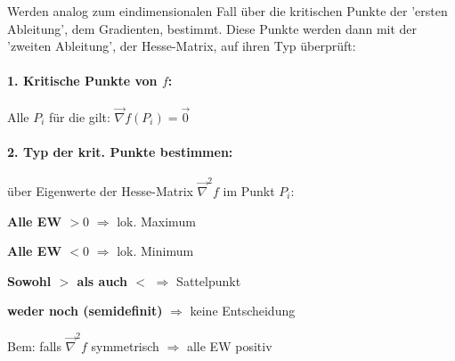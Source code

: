 \documentclass[a4paper]{article}
\begin{document}
		\begin{fsatz}
			Werden analog zum eindimensionalen Fall über die kritischen Punkte der 'ersten Ableitung', dem Gradienten, bestimmt. Diese Punkte werden dann mit der 'zweiten Ableitung', der Hesse-Matrix, auf ihren Typ überprüft:
				\vspace{-3mm}

			\paragraph{1. Kritische Punkte von $f$:} Alle $P_i$ für die gilt: $\vec{\nabla} f (P_i) = \vec{0}$
				\vspace{-3mm}

			\paragraph{2. Typ der krit. Punkte bestimmen: } über Eigenwerte der Hesse-Matrix $\vec{\nabla}^2 f$ im Punkt $P_i$:
				\vspace{-2mm}
				\begin{itemize_compact}
					\item \textbf{Alle EW $> 0$} $\Rightarrow$ lok. Maximum
					\item \textbf{Alle EW $< 0$} $\Rightarrow$ lok. Minimum
					\item \textbf{Sowohl $>$ als auch $<$} $\Rightarrow$ Sattelpunkt
					\item \textbf{weder noch (semidefinit)} $\Rightarrow$ keine Entscheidung
				\end{itemize_compact}
				\vspace{-2mm}
			Bem: falls $\vec{\nabla}^2 f$ symmetrisch $\Rightarrow$ alle EW positiv
		\end{fsatz}
\end{document}
